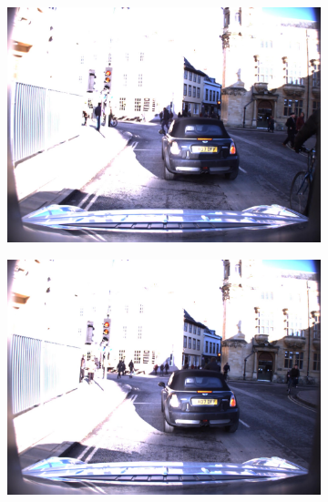 \documentclass[10pt, aspectratio=169]{beamer}
\begin{document}
\begin{frame}{}
       \begin{figure}
        \centering
        \begin{subfigure}{0.46\textwidth}
            \includegraphics[width=\textwidth]{contents/images/ex3/02744.jpg}
        \end{subfigure}
        \hfill
        \hfill
        \begin{subfigure}{0.46\textwidth}
            \includegraphics[width=\textwidth]{contents/images/ex3/02784.jpg}
        \end{subfigure}
    \end{figure}
\end{frame}
\end{document}
